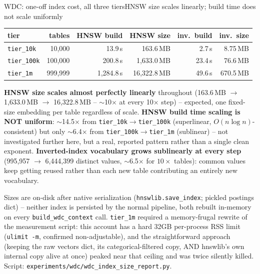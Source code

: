 \documentclass[aspectratio=169,10pt]{beamer}
\newcommand{\highlight}[1]{{\color{Cat1}\bfseries #1}}
\begin{document}
\begin{frame}{WDC: one-off index cost, all three tiers}{HNSW size scales linearly; build time does not scale uniformly}
\small
\begin{center}
\begin{tabular}{lrrrrr}
\toprule
tier & tables & HNSW build & HNSW size & inv.\ build & inv.\ size \\
\midrule
\texttt{tier\_10k} & 10{,}000 & 13.9\,s & 163.6\,MB & 2.7\,s & 8.75\,MB \\
\texttt{tier\_100k} & 100{,}000 & 200.8\,s & 1{,}633.0\,MB & 23.4\,s & 76.6\,MB \\
\texttt{tier\_1m} & 999{,}999 & 1{,}284.8\,s & 16{,}322.8\,MB & 49.6\,s & 670.5\,MB \\
\bottomrule
\end{tabular}
\end{center}

\vspace{6pt}
\highlight{HNSW size scales almost perfectly linearly} throughout (163.6\,MB $\to$ 1{,}633.0\,MB $\to$ 16{,}322.8\,MB -- $\sim$10$\times$ at every 10$\times$ step) -- expected, one fixed-size embedding per table regardless of scale. \highlight{HNSW build time scaling is NOT uniform}: $\sim$14.5$\times$ from \texttt{tier\_10k}$\to$\texttt{tier\_100k} (superlinear, $O(n\log n)$-consistent) but only $\sim$6.4$\times$ from \texttt{tier\_100k}$\to$\texttt{tier\_1m} (sublinear) -- not investigated further here, but a real, reported pattern rather than a single clean exponent. \highlight{Inverted-index vocabulary grows sublinearly at every step} (995{,}957 $\to$ 6{,}444{,}399 distinct values, $\sim$6.5$\times$ for $10\times$ tables): common values keep getting reused rather than each new table contributing an entirely new vocabulary.

\vspace{2pt}
{\footnotesize\color{Muted} Sizes are on-disk after native serialization (\texttt{hnswlib.save\_index}; pickled postings dict) -- neither index is persisted by the normal pipeline, both rebuilt in-memory on every \texttt{build\_wdc\_context} call. \texttt{tier\_1m} required a memory-frugal rewrite of the measurement script: this account has a hard 32GB per-process RSS limit (\texttt{ulimit -m}, confirmed non-adjustable), and the straightforward approach (keeping the raw vectors dict, its categorical-filtered copy, AND hnswlib's own internal copy alive at once) peaked near that ceiling and was twice silently killed. Script: \texttt{experiments/wdc/wdc\_index\_size\_report.py}.}
\end{frame}
\end{document}
